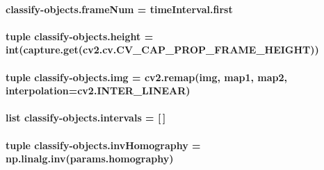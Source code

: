 \hypertarget{namespaceclassify-objects_a5452b0de8b058d1fa012cffe547284ce}{
\paragraph[{frame\-Num}]{\setlength{\rightskip}{0pt plus 5cm}classify-\/objects.\-frame\-Num = time\-Interval.\-first}}\label{namespaceclassify-objects_a5452b0de8b058d1fa012cffe547284ce}
\hypertarget{namespaceclassify-objects_a49e08fdaa91f51e67615275c9d62099f}{
\paragraph[{height}]{\setlength{\rightskip}{0pt plus 5cm}tuple classify-\/objects.\-height = int(capture.\-get(cv2.\-cv.\-C\-V\-\_\-\-C\-A\-P\-\_\-\-P\-R\-O\-P\-\_\-\-F\-R\-A\-M\-E\-\_\-\-H\-E\-I\-G\-H\-T))}}\label{namespaceclassify-objects_a49e08fdaa91f51e67615275c9d62099f}
\hypertarget{namespaceclassify-objects_a4fe0e391a47a3e5af1350ab57e1ef60e}{
\paragraph[{img}]{\setlength{\rightskip}{0pt plus 5cm}tuple classify-\/objects.\-img = cv2.\-remap(img, map1, map2, interpolation=cv2.\-I\-N\-T\-E\-R\-\_\-\-L\-I\-N\-E\-A\-R)}}\label{namespaceclassify-objects_a4fe0e391a47a3e5af1350ab57e1ef60e}
\hypertarget{namespaceclassify-objects_a3c13bd077bfc0ef3ef064d878d0f32b0}{
\paragraph[{intervals}]{\setlength{\rightskip}{0pt plus 5cm}list classify-\/objects.\-intervals = \mbox{[}$\,$\mbox{]}}}\label{namespaceclassify-objects_a3c13bd077bfc0ef3ef064d878d0f32b0}
\hypertarget{namespaceclassify-objects_a1027931e1c6b656a7de2661847cfa267}{
\paragraph[{inv\-Homography}]{\setlength{\rightskip}{0pt plus 5cm}tuple classify-\/objects.\-inv\-Homography = np.\-linalg.\-inv(params.\-homography)}}\label{namespaceclassify-objects_a1027931e1c6b656a7de2661847cfa267}
